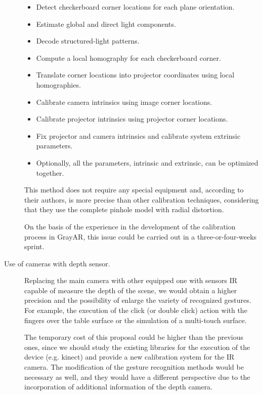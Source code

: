 \begin{description}
\begin{itemize}
\item Detect checkerboard corner locations for each plane orientation.
\item Estimate global and direct light components.
\item Decode structured-light patterns.
\item Compute a local homography for each checkerboard corner.
\item Translate corner locations into projector coordinates using local homographies.
\item Calibrate camera intrinsics using image corner locations.
\item Calibrate projector intrinsics using projector corner locations.
\item Fix projector and camera intrinsics and calibrate system extrinsic parameters.
\item Optionally, all the parameters, intrinsic and extrinsic, can be optimized together.
\end{itemize}

This method does not require any special equipment and, according to their authors, is more precise than other calibration techniques, considering that they use the complete pinhole model with radial distortion.
 
On the basis of the experience in the development of the calibration process in GrayAR, this issue could be carried out in a three-or-four-weeks sprint.

\item[Use of cameras with depth sensor.] Replacing the main camera with other equipped one with sensors IR capable of measure the depth of the scene, we would obtain a higher precision and the possibility of enlarge the variety of recognized gestures. For example, the execution of the click (or double click) action with the fingers over the table surface or the simulation of a multi-touch surface.

The temporary cost of this proposal could be higher than the previous ones, since we should study the existing libraries for the execution of the device (e.g. kinect) and provide a new calibration system for the IR camera. The modification of the gesture recognition methods would be necessary as well, and they would have a different perspective due to the incorporation of additional information of the depth camera.
\end{description}
